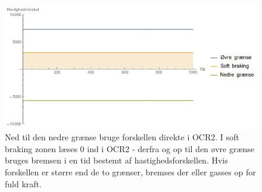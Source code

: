 \begin{figure}[h]

	\centering
		\includegraphics[scale=0.4]{Billeder/Braking.jpg}
	\caption{Ned til den nedre grænse bruge forskellen direkte i OCR2. I soft braking zonen læses 0 ind i OCR2 - derfra og op til den øvre grænse bruges bremsen i en tid bestemt af hastighedsforskellen. Hvis forskellen er større end de to grænser, bremses der eller gasses op for fuld kraft.}
	\label{fig:Forgiveness}
\end{figure}


